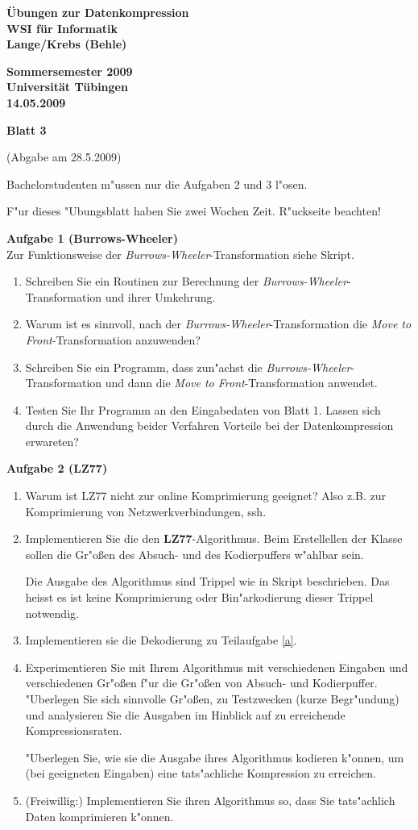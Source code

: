 \documentclass[a4paper]{article}
\def\header#1#2#3#4{\pagestyle{empty}
\noindent
\begin{minipage}[t]{0.6\textwidth}
\begin{flushleft}
\bf \"Ubungen zur Datenkompression\\
WSI f\"ur Informatik\\
Lange/Krebs (Behle)
\end{flushleft}
\end{minipage}
\begin{minipage}[t]{0.4\textwidth}
\begin{flushright}
\bf Sommersemester 2009\\
Universit\"at T\"ubingen\\
#2 %
\end{flushright}
\end{minipage}

\begin{center}
{\Large\bf Blatt #1}

{(Abgabe am #3)}
\end{center}
}
\begin{document}
\header{3}{14.05.2009}{28.5.2009}{}

\bigskip

Bachelorstudenten m"ussen nur die Aufgaben 2 und 3 l"osen.

F"ur dieses "Ubungsblatt haben Sie zwei Wochen Zeit. R"uckseite beachten!

\bigskip

{\bf Aufgabe 1  \quad(Burrows-Wheeler) }\\
Zur Funktionsweise der {\em Burrows-Wheeler}-Transformation siehe Skript.

\begin{enumerate}
\item Schreiben Sie ein Routinen zur Berechnung der {\em Burrows-Wheeler}-Transformation und ihrer Umkehrung.
\item Warum ist es sinnvoll, nach der {\em Burrows-Wheeler}-Transformation die {\em Move to Front}-Transformation anzuwenden?
\item Schreiben Sie ein Programm, dass zun"achst die  {\em Burrows-Wheeler}-Transformation und dann die {\em Move to Front}-Transformation anwendet.
\item Testen Sie Ihr Programm an den Eingabedaten von Blatt 1. Lassen sich durch die Anwendung beider Verfahren Vorteile bei der Datenkompression erwareten?
\end{enumerate}

\bigskip

{\bf Aufgabe 2  \quad(LZ77)}\\
\begin{enumerate}
\item Warum ist LZ77 nicht zur online Komprimierung geeignet? Also z.B. zur Komprimierung von Netzwerkverbindungen, ssh.
\item\label{a} Implementieren Sie die den {\bf LZ77}-Algorithmus. Beim Erstellellen der Klasse sollen die Gr"o{\ss}en des Absuch- und des Kodierpuffers w"ahlbar sein.

Die Ausgabe des Algorithmus sind Trippel wie in Skript beschrieben. Das heisst es ist keine Komprimierung oder Bin"arkodierung dieser Trippel notwendig.

\item Implementieren sie die Dekodierung zu Teilaufgabe \ref{a}.
\item Experimentieren Sie mit Ihrem Algorithmus mit verschiedenen Eingaben und verschiedenen Gr"o{\ss}en f"ur die Gr"o{\ss}en von Absuch- und Kodierpuffer. "Uberlegen Sie sich sinnvolle Gr"o{\ss}en, zu Testzwecken (kurze Begr"undung) und analysieren Sie die Ausgaben im Hinblick auf zu erreichende Kompressionsraten.

"Uberlegen Sie, wie sie die Ausgabe ihres Algorithmus kodieren k"onnen, um (bei geeigneten Eingaben) eine tats"achliche Kompression zu erreichen.

\item(Freiwillig:) Implementieren Sie ihren Algorithmus so, dass Sie tats"achlich Daten komprimieren k"onnen.
\end{enumerate}
\end{document}
